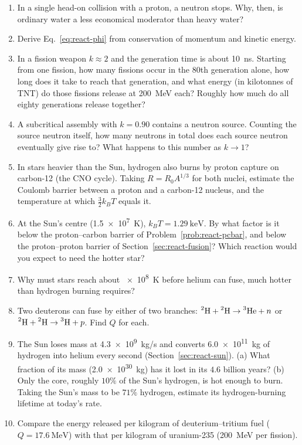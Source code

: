 \begin{enumerate}[itemsep=3pt]
\item In a single head-on collision with a proton, a neutron stops. Why, then, is ordinary water a less
      economical moderator than heavy water?
\item Derive Eq.~\eqref{eq:react-phi} from conservation of momentum and kinetic energy.
\item In a fission weapon $k\approx2$ and the generation time is about \SI{10}{ns}. Starting from one
      fission, how many fissions occur in the 80th generation alone, how long does it take to reach that
      generation, and what energy (in kilotonnes of TNT) do those fissions release at \SI{200}{\MeV} each?
      Roughly how much do all eighty generations release together?
\item A subcritical assembly with $k=0.90$ contains a neutron source. Counting the source neutron itself,
      how many neutrons in total does each source neutron eventually give rise to? What happens to this
      number as $k\to1$?
\item\label{prob:react-pcbar} In stars heavier than the Sun, hydrogen also burns by proton capture on
      carbon-12 (the CNO cycle). Taking $R=R_0A^{1/3}$ for both nuclei, estimate the Coulomb barrier
      between a proton and a carbon-12 nucleus, and the temperature at which $\tfrac32k_BT$ equals it.
\item At the Sun's centre (\SI{1.5e7}{K}), $k_BT=\SI{1.29}{\keV}$. By what factor is it below the
      proton--carbon barrier of Problem~\ref{prob:react-pcbar}, and below the proton--proton barrier of
      Section~\ref{sec:react-fusion}? Which reaction would you expect to need the hotter star?
\item Why must stars reach about \SI{e8}{K} before helium can fuse, much hotter than hydrogen burning
      requires?
\item Two deuterons can fuse by either of two branches: $\prescript{2}{}{\mathrm{H}}+\prescript{2}{}{\mathrm{H}}\to\prescript{3}{}{\mathrm{He}}+n$ or
      $\prescript{2}{}{\mathrm{H}}+\prescript{2}{}{\mathrm{H}}\to\prescript{3}{}{\mathrm{H}}+p$. Find $Q$ for each.
\item The Sun loses mass at \SI{4.3e9}{kg/s} and converts \SI{6.0e11}{kg} of hydrogen into helium
      every second (Section~\ref{sec:react-sun}). (a) What fraction of its mass (\SI{2.0e30}{kg}) has it
      lost in its $4.6$ billion years? (b) Only the core, roughly $10\%$ of the Sun's hydrogen, is hot
      enough to burn. Taking the Sun's mass to be $71\%$ hydrogen, estimate its hydrogen-burning
      lifetime at today's rate.
\item Compare the energy released per kilogram of deuterium--tritium fuel ($Q=\SI{17.6}{\MeV}$) with that
      per kilogram of uranium-235 (\SI{200}{\MeV} per fission).
\end{enumerate}


